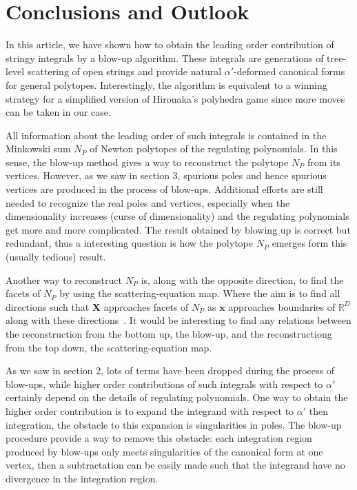\documentclass[12pt]{article}
\theoremstyle{definition}
\theoremstyle{plain}
\begin{document}
\section{Conclusions and Outlook}


In this article, we have shown how to obtain the leading order contribution of stringy integrals by a blow-up algorithm. These integrals are generations of tree-level scattering of open strings and provide natural $\alpha'$-deformed canonical forms for general polytopes.  Interestingly, the algorithm is equivalent to a winning strategy for a simplified version of Hironaka's polyhedra game since more moves can be taken in our case.

All information about the leading order of such integrals is contained in the Minkowski sum $N_{P}$ of Newton polytopes of the regulating polynomials. In this sense, the blow-up method gives a way to reconstruct the polytope $N_{P}$ from its vertices. However, as we saw in section 3, spurious poles and hence spurious vertices are produced in the process of blow-ups. Additional efforts are still needed to recognize the real poles and vertices, especially when the dimensionality increases (curse of dimensionality) and the regulating polynomials get more and more complicated. The result obtained by blowing up is correct but redundant, thus a interesting question is how the polytope $N_{P}$ emerges form this (usually tedious) result. 


Another way to reconstruct $N_{P}$ is, along with the opposite direction, to find the facets of $N_{P}$ by using the scattering-equation map. Where the aim is to find all directions such that $\mathbf{X}$ approaches facets of $N_{P}$ as $\mathbf{x}$ approaches boundaries of $\mathds{R}^{D}$ along with these directions~\cite{}. It would be interesting to find any relations between the reconstruction from the bottom up, the blow-up, and the reconstructiong from the top down, the scattering-equation map.

As we saw in section 2, lots of terms have been dropped during the process of blow-ups, while higher order contributions of such integrals with respect to $\alpha'$ certainly depend on the details of regulating polynomials. One way to obtain the higher order contribution is to expand the integrand with respect to $\alpha'$ then integration, the obstacle to this expansion is singularities in poles. The blow-up procedure provide a way to remove this obstacle: each integration region produced by blow-ups only meets singularities of the canonical form at one vertex, then a subtractation can be easily made such that the integrand have no divergence in the integration region.
\end{document}
